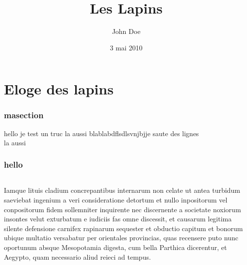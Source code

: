 \documentclass{book}
\title{Les Lapins}
\author{John Doe}
\date{3 mai 2010}
\begin{document}
\maketitle

 \part{Eloge des lapins}
 \section*{masection}
 hello je test un truc
 la aussi \newline blablabdflsdlsvnjbj\newline je saute des lignes\\ la aussi
 

\begin{flushright}
 \section*{hello}
 \paragraph{}
Iamque lituis cladium concrepantibus internarum non celate ut antea turbidum saeviebat ingenium a veri consideratione detortum et nullo inpositorum vel conpositorum fidem sollemniter inquirente nec discernente a societate noxiorum insontes velut exturbatum e iudiciis fas omne discessit, et causarum legitima silente defensione carnifex rapinarum sequester et obductio capitum et bonorum ubique multatio versabatur per orientales provincias, quas recensere puto nunc oportunum absque Mesopotamia digesta, cum bella Parthica dicerentur, et Aegypto, quam necessario aliud reieci ad tempus.


\end{flushright}
\end{document}
